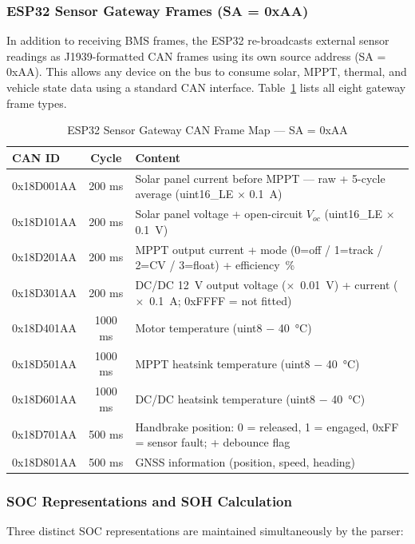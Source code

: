 \subsubsection{ESP32 Sensor Gateway Frames (SA = 0xAA)}

In addition to receiving BMS frames, the ESP32 re-broadcasts external sensor readings as J1939-formatted CAN frames using its own source address (SA = 0xAA). This allows any device on the bus to consume solar, MPPT, thermal, and vehicle state data using a standard CAN interface. Table~\ref{tab:can-parser-esp32} lists all eight gateway frame types.

\begin{table}[H]
\centering
\caption{ESP32 Sensor Gateway CAN Frame Map --- SA = 0xAA}
\label{tab:can-parser-esp32}
\small
\begin{tabular}{>{\ttfamily}p{3.2cm} c p{8.0cm}}
\toprule
\textbf{CAN ID} & \textbf{Cycle} & \textbf{Content} \\
\midrule
0x18D001AA & 200 ms & Solar panel current before MPPT — raw + 5-cycle average (uint16\_LE $\times$ 0.1~A) \\
0x18D101AA & 200 ms & Solar panel voltage + open-circuit $V_{oc}$ (uint16\_LE $\times$ 0.1~V) \\
0x18D201AA & 200 ms & MPPT output current + mode (0=off / 1=track / 2=CV / 3=float) + efficiency~\% \\
0x18D301AA & 200 ms & DC/DC 12~V output voltage ($\times$~0.01~V) + current ($\times$~0.1~A; 0xFFFF = not fitted) \\
0x18D401AA & 1000 ms & Motor temperature (uint8 $-$ 40~°C) \\
0x18D501AA & 1000 ms & MPPT heatsink temperature (uint8 $-$ 40~°C) \\
0x18D601AA & 1000 ms & DC/DC heatsink temperature (uint8 $-$ 40~°C) \\
0x18D701AA & 500 ms & Handbrake position: 0 = released, 1 = engaged, 0xFF = sensor fault; + debounce flag \\
0x18D801AA & 500 ms & GNSS information (position, speed, heading) \\
\bottomrule
\end{tabular}
\end{table}

\subsubsection{SOC Representations and SOH Calculation}

Three distinct SOC representations are maintained simultaneously by the parser:

